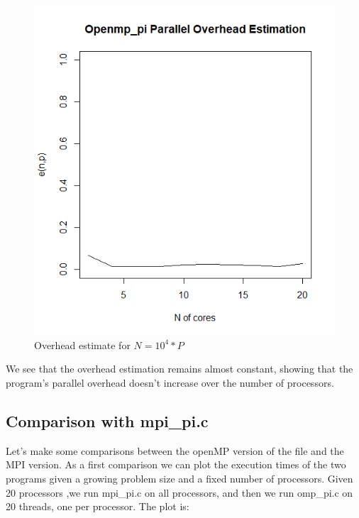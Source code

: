 \documentclass{article}
\begin{document}
\begin{figure}[H] %
	\centering
	\includegraphics[width=0.8\columnwidth]{graphs/openmp_pi_strongscaling_overhead} %
	\caption{Overhead estimate for $N=10^4*P$}
\end{figure}
We see that the overhead estimation remains almost constant, showing that the program's parallel overhead doesn't increase over the number of processors.
\subsection{Comparison with mpi\_pi.c}
Let's make some comparisons between the openMP version of the file and the MPI version.
As a first comparison we can plot the execution times of the two programs given a growing problem size and a fixed number of processors. Given 20 processors ,we run mpi\_pi.c on all processors, and then we run omp\_pi.c on 20 threads, one per processor. The plot is:
\end{document}
